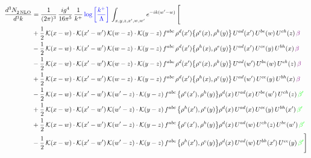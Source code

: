 \documentclass[9pt]{article}
\numberwithin{equation}{section}
\begin{document}
\begin{align}
    \frac{d^{3}N_{2\,\rm NLO}^{\rm}}{d^{3}k}  & = \frac{1}{(2\pi)^{3}}\, \frac{ig^{4}}{16\pi^{5}}\, \frac{1}{k^{+}}\, {\color{blue}\log{\left[\frac{k^{+}}{\Lambda}\right]}}\, \int_{x,y,z,x^{\prime},w,w^{\prime}}e^{-ik(w^{\prime}-w)}\, \Bigg[\notag \\ & +\frac{1}{2}\,\mathcal{K}(x-w)\cdot\mathcal{K}(x'-w')\,\mathcal{K}(w-z)\cdot\mathcal{K}(y-z)\, f^{abc}\,\rho^{d}(x')\big\{\rho^{e}(x),\rho^{h}(y)\big\}\,U^{ad}(x')\,U^{be}(w)\,U^{ch}(z)\,{\color{violet} \beta}\notag\\ &-\frac{1}{2}\,\mathcal{K}(x-w)\cdot\mathcal{K}(x'-w')\,\mathcal{K}(w-z)\cdot\mathcal{K}(y-z)\, f^{abc}\,\rho^{d}(x')\big\{\rho^{h}(x),\rho^{e}(y)\big\}\,U^{ad}(x')\,U^{ce}(y)\,U^{bh}(x)\,{\color{violet} \beta}\notag\\ &-\frac{1}{2}\,\mathcal{K}(x-w)\cdot\mathcal{K}(x'-w')\,\mathcal{K}(w-z)\cdot\mathcal{K}(y-z)\, f^{abc}\,\rho^{d}(x')\big\{\rho^{e}(x),\rho^{h}(y)\big\}\,U^{ad}(w')\,U^{be}(w)\,U^{ch}(z)\,{\color{violet} \beta}\notag \\ &+\frac{1}{2}\,\mathcal{K}(x-w)\cdot\mathcal{K}(x'-w')\,\mathcal{K}(w-z)\cdot\mathcal{K}(y-z)\, f^{abc}\,\rho^{d}(x')\big\{\rho^{h}(x),\rho^{e}(y)\big\}\,U^{ad}(w')\,U^{ce}(y)\,U^{bh}(x)\,{\color{violet} \beta}\notag\\
&-\frac{1}{2}\,\mathcal{K}(x-w)\cdot\mathcal{K}(x'-w')\,\mathcal{K}(w'-z)\cdot\mathcal{K}(y-z)\, f^{abc}\,\big\{\rho^{e}(x'),\rho^{h}(y)\big\}\rho^{d}(x)\,U^{ad}(x)\,U^{be}(w')\,U^{ch}(z)\,{\color{green} \beta'}\notag \\ & +\frac{1}{2}\,\mathcal{K}(x-w)\cdot\mathcal{K}(x'-w')\,\mathcal{K}(w'-z)\cdot\mathcal{K}(y-z)\, f^{abc}\,\big\{\rho^{h}(x'),\rho^{e}(y)\big\}\rho^{d}(x)\,U^{ad}(x)\,U^{ce}(y)\,U^{bh}(x')\,{\color{green} \beta'} \notag\\ & +\frac{1}{2}\,\mathcal{K}(x-w)\cdot\mathcal{K}(x'-w')\,\mathcal{K}(w'-z)\cdot\mathcal{K}(y-z)\, f^{abc}\,\big\{\rho^{e}(x'),\rho^{h}(y)\big\}\rho^{d}(x)\,U^{ad}(w)\,U^{ch}(z)\,U^{be}(w')\,{\color{green} \beta'} \notag\\
& -\frac{1}{2}\,\mathcal{K}(x-w)\cdot\mathcal{K}(x'-w')\,\mathcal{K}(w'-z)\cdot\mathcal{K}(y-z)\, f^{abc}\,\big\{\rho^{h}(x'),\rho^{e}(y)\big\}\rho^{d}(x)\,U^{ad}(w)\,U^{bh}(x')\,U^{ce}(y)\,{\color{green} \beta'}\Bigg]
\end{align}
\end{document}
